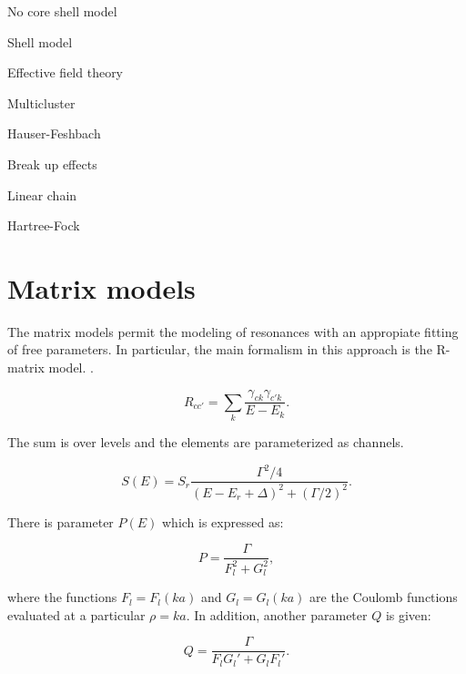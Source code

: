 \documentclass[openany]{book}
\begin{document}
No core shell model \cite{dohet-eraly_navratil_quaglioni_horiuchi_hupin_raimondi_2016}

Shell model \cite{dong_wang_michel_ploszajczak_2022}
\cite{tazawa_1974}

Effective field theory \cite{sadeghi_khalili_godarzi_2013}
\cite{higa_premarathna_rupak_2022}

Multicluster \cite{dufour_descouvemont_1997}
\cite{simenel_keser_umar_oberacker_2013}

Hauser-Feshbach \cite{jayatissa_avila_rehm_talwar_mohr_auranen_chen_gorelov_hoffman_jiang_et_2022}

Break up effects \cite{shubhchintak_descouvemont_2022}

Linear chain \cite{baba_taniguchi_kimura_2022}

Hartree-Fock \cite{leanh_minhloc_2022}


\section{Matrix models}  \label{sec:matrixModels}

The matrix models permit the modeling of resonances with an appropiate fitting of free parameters. In particular, the main formalism in this approach is the R-matrix model. \cite{lane_thomas_1958}.

\begin{equation}  \label{eq:rmatrix_elements}
	R_{cc'} = \sum_k {\frac{\gamma_{ck} \gamma_{c'k}}{E - E_k}}.
\end{equation}

The sum is over levels and the elements are parameterized as channels. 


\begin{equation} \label{eq:rmatrix_sfactor}
	S(E) = S_r \frac{\Gamma^2/4}{(E-E_r + \Delta)^2 + (\Gamma/2)^2}.
\end{equation}

There is parameter $P(E)$ which is expressed as: 

\begin{equation} \label{eq:rmatrix_penetrationFactor}
	P= \frac{\Gamma}{F_l^2 + G_l^2},
\end{equation}

where the functions $F_l = F_l(ka)$ and $G_l = G_l(ka)$ are the Coulomb functions evaluated at a particular $\rho = ka$. In addition, another parameter $Q$ is given: 

\begin{equation} \label{eq:rmatrix_QFactor}
	Q = \frac{\Gamma}{F_lG_l' + G_lF_l'}.
\end{equation}
\end{document}
